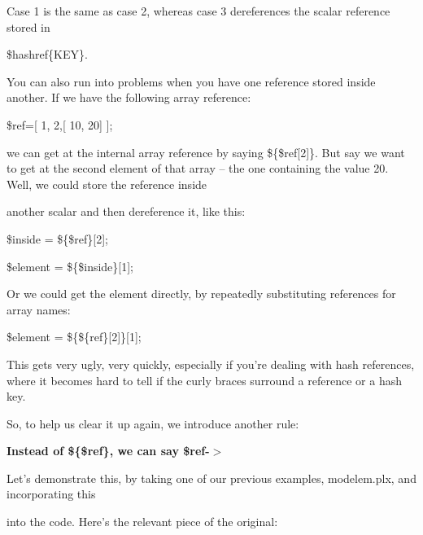 \documentclass[a4paper,11pt]{book}
\begin{document}
\noindent Case 1 is the same as case 2, whereas case 3 dereferences the scalar reference stored in

\noindent \$hashref\{KEY\}.

\noindent 

\noindent You can also run into problems when you have one reference stored inside another. If we have the following array reference:

\noindent 

\noindent 

\noindent \$ref=[ 1, 2,[ 10, 20] ];

\noindent 

\noindent we can get at the internal array reference by saying \$\{\$ref[2]\}. But say we want to get at the second element of that array -- the one containing the value 20. Well, we could store the reference inside

\noindent another scalar and then dereference it, like this:

\noindent 

\noindent 

\noindent \$inside  = \$\{\$ref\}[2];

\noindent \$element = \$\{\$inside\}[1];

\noindent 

\noindent Or we could get the element directly, by repeatedly substituting references for array names:

\noindent 

\noindent 

\noindent \$element = \$\{\$\{ref\}[2]\}[1];

\noindent 

\noindent This gets very ugly, very quickly, especially if you're dealing with hash references, where it becomes hard to tell if the curly braces surround a reference or a hash key.

\noindent 

\noindent So, to help us clear it up again, we introduce another rule:

\noindent 

\noindent 

\noindent \textbf{Instead of \$\{\$ref\}, we can say \$ref-$>$}

\noindent 

\noindent 

\noindent Let's demonstrate this, by taking one of our previous examples, modelem.plx, and incorporating this

\noindent into the code. Here's the relevant piece of the original:
\end{document}
